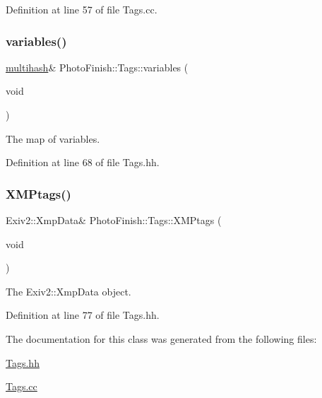 Definition at line 57 of file Tags.\+cc.

\mbox{\label{class_photo_finish_1_1_tags_a22f5d1f5401c064f8a0ba3a41cd5c1d0}} 
\subsubsection{\texorpdfstring{variables()}{variables()}}
{\footnotesize\ttfamily \hyperlink{namespace_photo_finish_a6f41796f162687538b7da5c7a95e2d18}{multihash}\& Photo\+Finish\+::\+Tags\+::variables (\begin{DoxyParamCaption}\item[{void}]{ }\end{DoxyParamCaption})\hspace{0.3cm}{\ttfamily [inline]}}



The map of variables. 



Definition at line 68 of file Tags.\+hh.

\mbox{\label{class_photo_finish_1_1_tags_a59d39abc7bc6fd55e14aa9e17a07f220}} 
\subsubsection{\texorpdfstring{X\+M\+Ptags()}{XMPtags()}}
{\footnotesize\ttfamily Exiv2\+::\+Xmp\+Data\& Photo\+Finish\+::\+Tags\+::\+X\+M\+Ptags (\begin{DoxyParamCaption}\item[{void}]{ }\end{DoxyParamCaption})\hspace{0.3cm}{\ttfamily [inline]}}



The Exiv2\+::\+Xmp\+Data object. 



Definition at line 77 of file Tags.\+hh.



The documentation for this class was generated from the following files\+:\begin{DoxyCompactItemize}
\item 
\hyperlink{_tags_8hh}{Tags.\+hh}\item 
\hyperlink{_tags_8cc}{Tags.\+cc}\end{DoxyCompactItemize}
